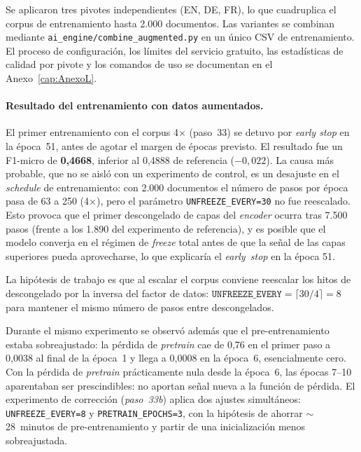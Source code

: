 Se aplicaron tres pivotes independientes (EN, DE, FR), lo que cuadruplica el corpus de entrenamiento hasta 2.000 documentos. Las variantes se combinan mediante \texttt{ai\_engine/combine\_augmented.py} en un único CSV de entrenamiento. El proceso de configuración, los límites del servicio gratuito, las estadísticas de calidad por pivote y los comandos de uso se documentan en el Anexo~\ref{cap:AnexoL}.

\paragraph{Resultado del entrenamiento con datos aumentados.}
El primer entrenamiento con el corpus 4× (paso~33) se detuvo por \emph{early stop} en la época~51, antes de agotar el margen de épocas previsto. El resultado fue un F1-micro de \textbf{0,4668}, inferior al 0,4888 de referencia ($-0{,}022$). La causa más probable, que no se aisló con un experimento de control, es un desajuste en el \emph{schedule} de entrenamiento: con 2.000 documentos el número de pasos por época pasa de 63 a 250 (4×), pero el parámetro \texttt{UNFREEZE\_EVERY=30} no fue reescalado. Esto provoca que el primer descongelado de capas del \emph{encoder} ocurra tras 7.500 pasos (frente a los 1.890 del experimento de referencia), y es posible que el modelo converja en el régimen de \emph{freeze} total antes de que la señal de las capas superiores pueda aprovecharse, lo que explicaría el \emph{early~stop} en la época 51.

La hipótesis de trabajo es que al escalar el corpus conviene reescalar los hitos de descongelado por la inversa del factor de datos: $\texttt{UNFREEZE\_EVERY} = \lceil 30 / 4 \rceil = 8$ para mantener el mismo número de pasos entre descongelados.

Durante el mismo experimento se observó además que el pre-entrenamiento estaba sobreajustado: la pérdida de \emph{pretrain} cae de 0,76 en el primer paso a 0,0038 al final de la época~1 y llega a 0,0008 en la época~6, esencialmente cero. Con la pérdida de \emph{pretrain} prácticamente nula desde la época~6, las épocas 7--10 aparentaban ser prescindibles: no aportan señal nueva a la función de pérdida. El experimento de corrección (\emph{paso~33b}) aplica dos ajustes simultáneos: \texttt{UNFREEZE\_EVERY=8} y \texttt{PRETRAIN\_EPOCHS=3}, con la hipótesis de ahorrar $\sim$28~minutos de pre-entrenamiento y partir de una inicialización menos sobreajustada.

